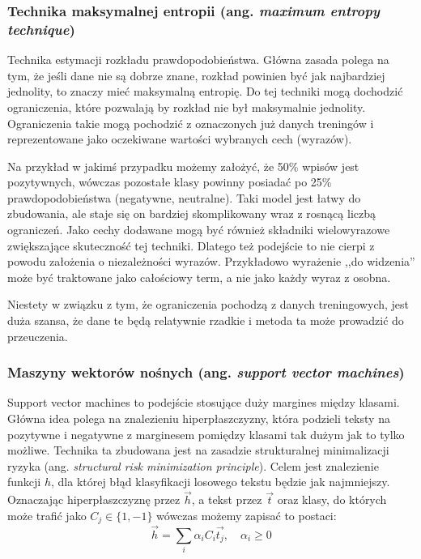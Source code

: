 \subsubsection{Technika maksymalnej entropii (ang. \textit{maximum entropy technique})}
Technika estymacji rozkładu prawdopodobieństwa. Główna zasada polega na tym,
że jeśli dane nie są dobrze znane, rozkład powinien być jak najbardziej jednolity,
to znaczy mieć maksymalną entropię. Do tej techniki mogą dochodzić ograniczenia,
które pozwalają by rozkład nie był maksymalnie jednolity. Ograniczenia
takie mogą pochodzić z oznaczonych już danych treningów i reprezentowane jako
oczekiwane wartości wybranych cech (wyrazów). 

Na przykład w jakimś przypadku
możemy założyć, że 50\% wpisów jest pozytywnych, wówczas pozostałe klasy
powinny posiadać po 25\% prawdopodobieństwa (negatywne, neutralne).
Taki model jest łatwy do zbudowania, ale staje się on bardziej skomplikowany
wraz z rosnącą liczbą ograniczeń. Jako cechy dodawane mogą być również
składniki wielowyrazowe zwiększające skuteczność tej techniki. Dlatego też
podejście to nie cierpi z powodu założenia o niezależności wyrazów.
Przykładowo wyrażenie ,,do widzenia'' może być traktowane jako całościowy term,
a nie jako każdy wyraz z osobna.

Niestety w związku z tym, że ograniczenia pochodzą z danych treningowych,
jest duża szansa, że dane te będą relatywnie rzadkie i metoda ta może prowadzić
do przeuczenia.


\subsubsection{Maszyny wektorów nośnych (ang. \textit{support vector machines})}
Support vector machines to podejście stosujące duży margines między klasami.
Główna idea polega na znalezieniu hiperpłaszczyzny, która podzieli teksty na pozytywne
i negatywne z marginesem pomiędzy klasami tak dużym jak to tylko możliwe.
Technika ta zbudowana jest na zasadzie strukturalnej minimalizacji ryzyka 
(ang. \textit{structural risk minimization principle}). Celem jest znalezienie
funkcji $h$, dla której błąd klasyfikacji losowego tekstu będzie jak najmniejszy.
Oznaczając hiperpłaszczyznę przez $\vec{h}$, a tekst przez $\vec{t}$ oraz klasy, do
których może trafić jako $C_j \in \{1, -1\}$ wówczas możemy zapisać to 
postaci:
\begin{equation}
\vec{h} = \sum\limits_{i}\alpha_iC_i\vec{t_j}, \quad \alpha_i \geq 0
\end{equation}


